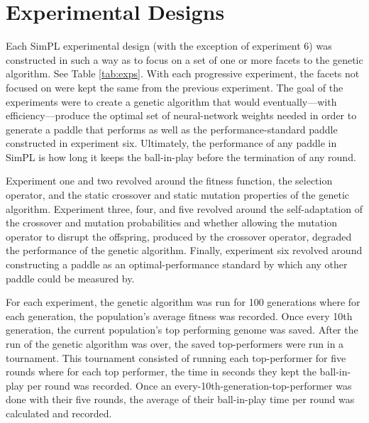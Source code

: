 \documentclass[a4paper,10pt]{article}
\begin{document}
\section{Experimental Designs}

Each SimPL experimental design (with the exception of experiment 6) was constructed in such a way as to focus on a set of one or more facets to the genetic algorithm. See Table \ref{tab:exps}. With each progressive experiment, the facets not focused on were kept the same from the previous experiment. The goal of the experiments were to create a genetic algorithm that would eventually---with efficiency---produce the optimal set of neural-network weights needed in order to generate a paddle that performs as well as the performance-standard paddle constructed in experiment six. Ultimately, the performance of any paddle in SimPL is how long it keeps the ball-in-play before the termination of any round.       

Experiment one and two revolved around the fitness function, the selection operator, and the static crossover and static mutation properties of the genetic algorithm. Experiment three, four, and five revolved around the self-adaptation of the crossover and mutation probabilities and whether allowing the mutation operator to disrupt the offspring, produced by the crossover operator, degraded the performance of the genetic algorithm. Finally, experiment six revolved around constructing a paddle as an optimal-performance standard by which any other paddle could be measured by.

For each experiment, the genetic algorithm was run for 100 generations where for each generation, the population's average fitness was recorded. Once every 10th generation, the current population's top performing genome was saved. After the run of the genetic algorithm was over, the saved top-performers were run in a tournament. This tournament consisted of running each top-performer for five rounds where for each top performer, the time in seconds they kept the ball-in-play per round was recorded. Once an every-10th-generation-top-performer was done with their five rounds, the average of their ball-in-play time per round was calculated and recorded.   

\renewcommand*\arraystretch{1.5}
\end{document}
